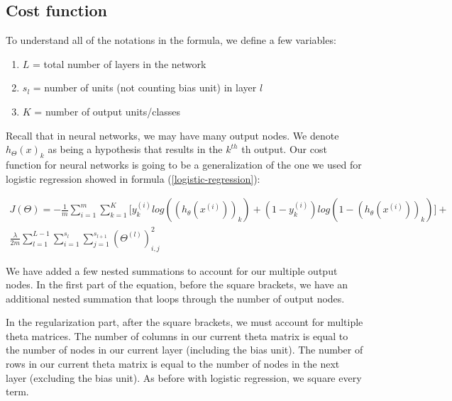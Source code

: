 \subsection{Cost function}

To understand all of the notations in the formula, we define a few variables:

\begin{enumerate}[label=\textbullet]
	\item $L$ = total number of layers in the network
	\item $s_l$ = number of units (not counting bias unit) in layer $l$
	\item $K$ = number of output units/classes
\end{enumerate}

Recall that in neural networks, we may have many output nodes. We denote $h_{\Theta}(x)_k$ as being a hypothesis that results in the $k^{th}$ th output. Our cost function for neural networks is going to be a generalization of the one we used for logistic regression showed in formula (\ref{logistic-regression}):

\begin{align*}
	J(\Theta) = - \frac{1}{m} \sum^m_{i=1}\sum^K_{k=1}\Bigg[ y^{(i)}_k log((h_{\theta}(x^{(i)}))_k) + (1 - y^{(i)}_k) log(1 - (h_{\theta}(x^{(i)}))_k) \Bigg] + \\
	\frac{\lambda}{2m}\sum^{L-1}_{l=1}\sum^{s_l}_{i=1}\sum^{s_{l+1}}_{j=1}(\Theta^{(l)})^2_{i,j}
\end{align*}

We have added a few nested summations to account for our multiple output nodes. In the first part of the equation, before the square brackets, we have an additional nested summation that loops through the number of output nodes.

In the regularization part, after the square brackets, we must account for multiple theta matrices. The number of columns in our current theta matrix is equal to the number of nodes in our current layer (including the bias unit). The number of rows in our current theta matrix is equal to the number of nodes in the next layer (excluding the bias unit). As before with logistic regression, we square every term.

